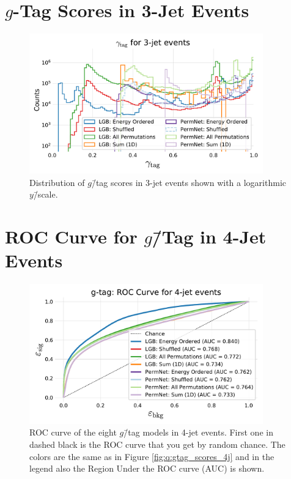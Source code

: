 \section[g-Tag Scores in 3-Jet Events]{$g$-Tag Scores in 3-Jet Events}
\begin{figure}[h!]
  \centerfloat
    \includegraphics[width=0.9\textwidth, trim=10 10 10 45, clip]{figures/quarks/gtag_y_pred_3_jet_hist-down_sample=1.00-ML_vars=vertex-selection=b-ejet_min=4-n_iter_RS_lgb=99-n_iter_RS_xgb=9-cdot_cut=0.90-version=19.pdf}
    \vspace{-0.5cm}
    \caption[$g$\=/Tag Scores in 3-Jet Events]
          {Distribution of $g$\=/tag scores in 3-jet events shown with a logarithmic $y$\=/scale.}   
    \label{fig:q:gtag_scores_3j}
  \end{figure}
  \clearpage




\FloatBarrier
\section[ROC Curve for g-Tag in 4-Jet Events]{ROC Curve for $g$\=/Tag in 4-Jet Events}
\begin{figure}[h!]
  \centerfloat
  \includegraphics[width=0.9\textwidth, trim=10 10 10 40, clip]{figures/quarks/gtag_ROC_4_jet-down_sample=1.00-ML_vars=vertex-selection=b-ejet_min=4-n_iter_RS_lgb=99-n_iter_RS_xgb=9-cdot_cut=0.90-version=19.pdf}
  \caption[ROC Curve for $g$\=/Tag in 4-Jet Events]
          {ROC curve of the eight $g$\=/tag models in 4-jet events. First one in dashed black is the ROC curve that you get by random chance. The colors are the same as in Figure \ref{fig:q:gtag_scores_4j} and in the legend also the Region Under the ROC curve (AUC) is shown.} 
\end{figure}
\vspace{3cm}
